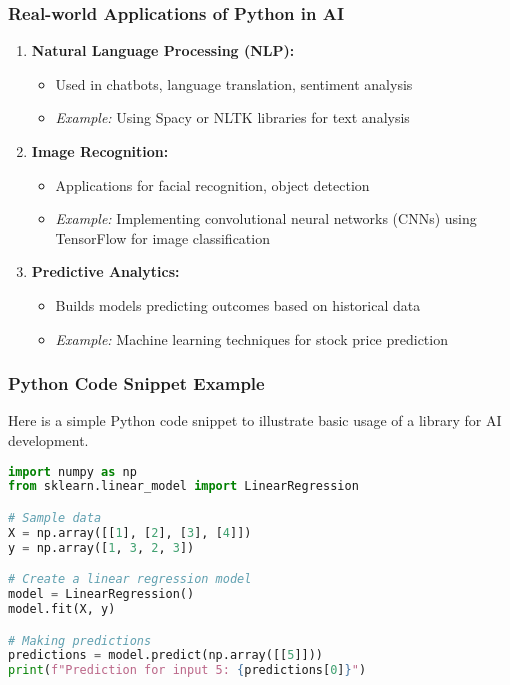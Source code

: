 \documentclass[aspectratio=169]{beamer}
\begin{document}
\begin{frame}[fragile]
    \frametitle{Real-world Applications of Python in AI}
    \begin{enumerate}
        \item \textbf{Natural Language Processing (NLP):}
        \begin{itemize}
            \item Used in chatbots, language translation, sentiment analysis
            \item \textit{Example:} Using Spacy or NLTK libraries for text analysis
        \end{itemize}
        
        \item \textbf{Image Recognition:}
        \begin{itemize}
            \item Applications for facial recognition, object detection
            \item \textit{Example:} Implementing convolutional neural networks (CNNs) using TensorFlow for image classification
        \end{itemize}
        
        \item \textbf{Predictive Analytics:}
        \begin{itemize}
            \item Builds models predicting outcomes based on historical data
            \item \textit{Example:} Machine learning techniques for stock price prediction
        \end{itemize}
    \end{enumerate}
\end{frame}

\begin{frame}[fragile]
    \frametitle{Python Code Snippet Example}
    Here is a simple Python code snippet to illustrate basic usage of a library for AI development.
    \begin{lstlisting}[language=Python]
import numpy as np
from sklearn.linear_model import LinearRegression

# Sample data
X = np.array([[1], [2], [3], [4]])
y = np.array([1, 3, 2, 3])

# Create a linear regression model
model = LinearRegression()
model.fit(X, y)

# Making predictions
predictions = model.predict(np.array([[5]]))
print(f"Prediction for input 5: {predictions[0]}")
    \end{lstlisting}
\end{frame}
\end{document}
